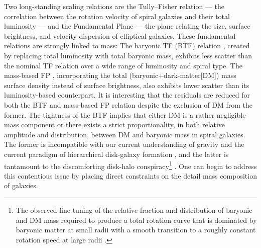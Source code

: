 \documentclass[apj,iop,numberedappendix]{emulateapj}
\begin{document}
Two long-standing scaling relations are the Tully--Fisher relation
\citep[][hereafter the TF relation]{1977A&A....54..661T} --- the correlation
between the rotation velocity of spiral galaxies and their total luminosity ---
and the Fundamental Plane \citep[FP;][]{1987ApJ...313...42D,
1987ApJ...313...59D} --- the plane relating the size, surface brightness, and
velocity dispersion of elliptical galaxies.  These fundamental relations are
strongly linked to mass:  The baryonic TF (BTF) relation
\citep{2000ApJ...533L..99M, 2005ApJ...632..859M}, created by replacing total
luminosity with total baryonic mass, exhibits less scatter than the nominal TF
relation over a wide range of luminosity and spiral type.  The mass-based FP
\citep{2007ApJ...665L.105B}, incorporating the total
(baryonic$+$dark-matter[DM]) mass surface density instead of surface brightness,
also exhibits lower scatter than its luminosity-based counterpart.  It is
interesting that the residuals are reduced for both the BTF and mass-based FP
relation despite the exclusion of DM from the former.  The tightness of the BTF
implies that either DM is a rather negligible mass component or there exists a
strict proportionality, in both relative amplitude and distribution, between DM
and baryonic mass in spiral galaxies.  The former is incompatible with our
current understanding of gravity and the current paradigm of hierarchical
disk-galaxy formation \citep[see, e.g.,][]{1980MNRAS.193..189F,
1997ApJ...482..659D, 1998MNRAS.295..319M, 2011MNRAS.410.1391A}, and the latter
is tantamount to the discomforting disk-halo conspiracy\footnote{
%
The observed fine tuning of the relative fraction and distribution of baryonic
and DM mass required to produce a total rotation curve that is dominated by
baryonic matter at small radii with a smooth transition to a roughly constant
rotation speed at large radii \citep[cf.][]{1991AJ....101.1231C,
2010A&A...519A..47A}.
%
} \citep[][hereafter ]{1986RSPTA.320..447V}.
One can begin to address this contentious issue by placing direct constraints on
the detail mass composition of galaxies.
\end{document}
